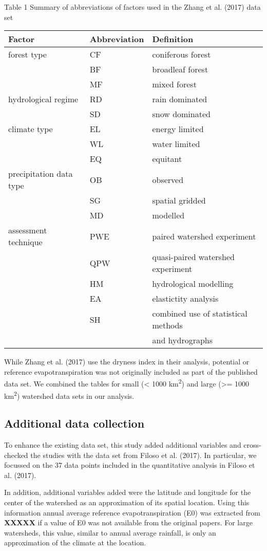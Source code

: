 \documentclass[]{elsarticle} %
\begin{document}
Table 1 Summary of abbreviations of factors used in the Zhang et al.
(2017) data set

\begin{longtable}[]{@{}lll@{}}
\toprule
Factor & Abbreviation & Definition\tabularnewline
\midrule
\endhead
forest type & CF & coniferous forest\tabularnewline
& BF & broadleaf forest\tabularnewline
& MF & mixed forest\tabularnewline
hydrological regime & RD & rain dominated\tabularnewline
& SD & snow dominated\tabularnewline
climate type & EL & energy limited\tabularnewline
& WL & water limited\tabularnewline
& EQ & equitant\tabularnewline
precipitation data type & OB & observed\tabularnewline
& SG & spatial gridded\tabularnewline
& MD & modelled\tabularnewline
assessment technique & PWE & paired watershed experiment\tabularnewline
& QPW & quasi-paired watershed experiment\tabularnewline
& HM & hydrological modelling\tabularnewline
& EA & elastictity analysis\tabularnewline
& SH & combined use of statistical methods\tabularnewline
& & and hydrographs\tabularnewline
\bottomrule
\end{longtable}

While Zhang et al. (2017) use the dryness index in their analysis,
potential or reference evapotranspiration was not originally included as
part of the published data set. We combined the tables for small
(\textless{} 1000 km\textsuperscript{2}) and large (\textgreater= 1000
km\textsuperscript{2}) watershed data sets in our analysis.

\hypertarget{additional-data-collection}{%
\subsection{Additional data
collection}\label{additional-data-collection}}

To enhance the existing data set, this study added additional variables
and cross-checked the studies with the data set from Filoso et al.
(2017). In particular, we focussed on the 37 data points included in the
quantitative analysis in Filoso et al. (2017).

In addition, additional variables added were the latitude and longitude
for the center of the watershed as an approximation of its spatial
location. Using this information annual average reference
evapotranspiration (E0) was extracted from \textbf{XXXXX} if a value of
E0 was not available from the original papers. For large watersheds,
this value, similar to annual average rainfall, is only an approximation
of the climate at the location.
\end{document}
